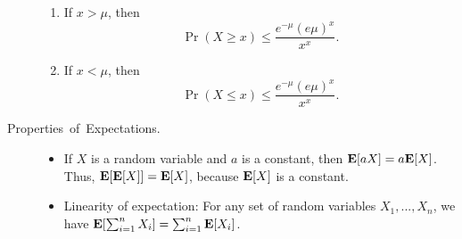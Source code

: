 \documentclass[11pt]{article}
\theoremstyle{mytheoremstyle}
\begin{document}
\begin{description}
	\begin{enumerate}
		\item If $x>\mu$, then 
		\[
		\Pr(X\geq x)\leq\frac{e^{-\mu}(e\mu)^{x}}{x^{x}}.
		\]
		\item If $x<\mu$, then
		\[
		\Pr(X\leq x)\leq\frac{e^{-\mu}(e\mu)^{x}}{x^{x}}.
		\]
	\end{enumerate}
	\item [{Properties~of~Expectations.}] 
	
	\begin{itemize}
		\item If $X$ is a random variable and $a$ is a constant, then $\mathrm{\mathbf{E}}[aX]=a\mathrm{\mathbf{E}}[X]$.
		Thus, $\mathrm{\mathrm{\mathbf{E}}}[\mathrm{\mathbf{E}}[X]]=\mathrm{\mathbf{E}}[X]$, because $\mathrm{\mathbf{E}}[X]$ is a constant.
		\item Linearity of expectation: For any set of random variables $X_{1},...,X_{n}$,
		we have $\mathrm{\mathbf{E}}[\sum_{i=1}^{n}X_{i}]=\sum_{i=1}^{n}\mathrm{\mathbf{E}}[X_{i}]$.
	\end{itemize}
\end{description}
\end{document}
